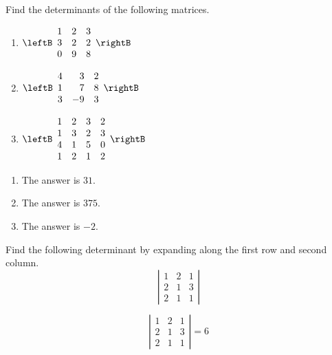 \begin{enumialphparenastyle}
\begin{ex} Find the determinants of the following matrices.
\begin{enumerate}
\item $\leftB
\begin{array}{rrr}
1 & 2 & 3 \\
3 & 2 & 2 \\
0 & 9 & 8
\end{array}
\rightB $ 
\item $\leftB
\begin{array}{rrr}
4 & 3 & 2 \\
1 & 7 & 8 \\
3 & -9 & 3
\end{array}
\rightB $
\item $\leftB
\begin{array}{rrrr}
1 & 2 & 3 & 2 \\
1 & 3 & 2 & 3 \\
4 & 1 & 5 & 0 \\
1 & 2 & 1 & 2
\end{array}
\rightB $
\end{enumerate}
\begin{sol}
\begin{enumerate}
\item The answer is $31$.
\item The answer is $375$.
\item The answer is $-2$.
\end{enumerate}
\end{sol}
\end{ex}

\begin{ex} Find the following determinant by expanding along the first row and
second column. 
\begin{equation*}
\left|
\begin{array}{rrr}
1 & 2 & 1 \\
2 & 1 & 3 \\
2 & 1 & 1
\end{array}
\right|
\end{equation*}
\begin{sol}
\[
\left|
\begin{array}{ccc}
1 & 2 & 1 \\
2 & 1 & 3 \\
2 & 1 & 1
\end{array}
\right| =  6
\]
\end{sol}
\end{ex}


\end{enumialphparenastyle}

